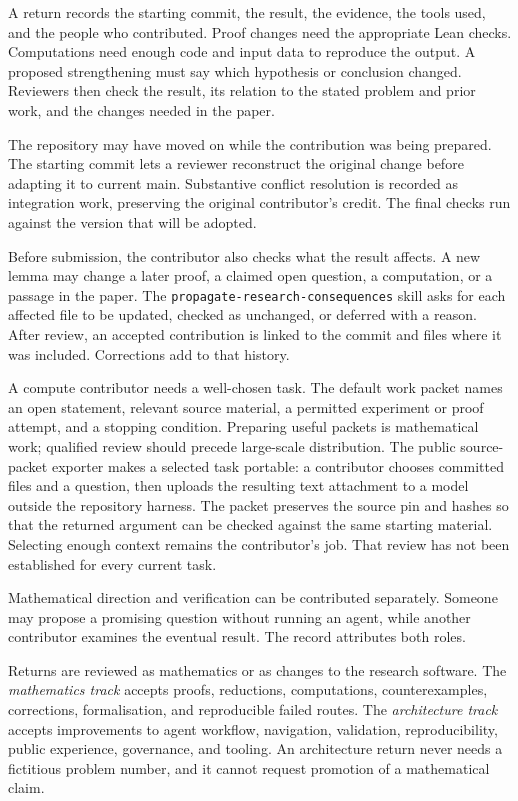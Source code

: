 \documentclass[10pt]{article}
\begin{document}
A return records the starting commit, the result, the evidence, the tools used,
and the people who contributed. Proof changes need the appropriate Lean
checks. Computations need enough code and input data to reproduce the output.
A proposed strengthening must say which hypothesis or conclusion changed.
Reviewers then check the result, its relation to the stated problem and prior
work, and the changes needed in the paper.

The repository may have moved on while the contribution was being prepared.
The starting commit lets a reviewer reconstruct the original change before
adapting it to current main. Substantive conflict resolution is recorded as
integration work, preserving the original contributor's credit. The final
checks run against the version that will be adopted.

Before submission, the contributor also checks what the result affects. A new
lemma may change a later proof, a claimed open question, a computation, or a
passage in the paper. The \texttt{propagate-research-consequences} skill asks
for each affected file to be updated, checked as unchanged, or deferred with
a reason. After review, an accepted contribution is linked to the commit and
files where it was included. Corrections add to that history.

A compute contributor needs a well-chosen task. The default work packet names
an open statement, relevant source material, a permitted experiment or proof
attempt, and a stopping condition. Preparing useful packets is mathematical
work; qualified review should precede large-scale distribution. The public
source-packet exporter makes a selected task portable: a contributor chooses
committed files and a question, then uploads the resulting text attachment to
a model outside the repository harness. The packet preserves the source pin
and hashes so that the returned argument can be checked against the same
starting material. Selecting enough context remains the contributor's job.
That review
has not been established for every current task.

Mathematical direction and verification can be contributed separately. Someone
may propose a promising question without running an agent, while another
contributor examines the eventual result. The record attributes both roles.

Returns are reviewed as mathematics or as changes to the research software.  The \emph{mathematics track}
accepts proofs, reductions, computations, counterexamples, corrections,
formalisation, and reproducible failed routes.  The \emph{architecture track}
accepts improvements to agent workflow, navigation, validation,
reproducibility, public experience, governance, and tooling.  An architecture
return never needs a fictitious problem number, and it cannot request
promotion of a mathematical claim.
\end{document}
